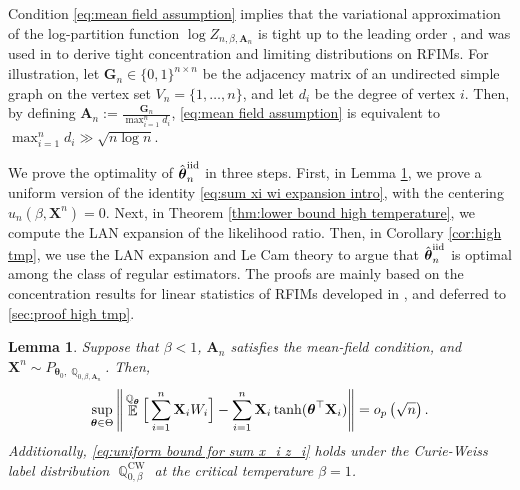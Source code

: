 \documentclass[preprint,reqno]{imsart}
\newtheorem{lemma}[thm]{Lemma}
\newcommand{\ttheta}{\boldsymbol{\theta}}
\DeclareMathOperator{\EE}{\mathbb{E}}
\DeclareMathOperator{\QQ}{\mathbb{Q}}
\newcommand{\A}{\mathbf{A}}
\newcommand{\X}{\mathbf{X}}
\DeclareMathOperator{\sumin}{\sum_{\mathnormal i=1}^{\mathnormal n}}
\newcommand{\thetaiid}{\hat{\boldsymbol \theta}^{\text{iid}}_{\mathnormal n}}
\begin{document}
%
\noindent Condition \eqref{eq:mean field assumption} implies that the variational approximation of the log-partition function $\log Z_{n,\beta,\A_n}$ is tight up to the leading order \citep[][also see eq. \eqref{eq:gibbs variational principle} below]{basak2017universality}, and was used in \cite{lee2024rfim,lee2025clt} to derive tight concentration and limiting distributions on RFIMs.
%
For illustration, let $\mathbf{G}_n \in \{0,1\}^{n \times n}$ be the adjacency matrix of an undirected simple graph on the vertex set $V_n = \{1, \ldots, n\}$, and let $d_i$ be the degree of vertex $i$. Then, by defining $ \A_n := \frac{\mathbf{G}_n}{\max_{i=1}^n d_i}$, \eqref{eq:mean field assumption} is 
equivalent to ${\max_{i=1}^n d_i} \gg \sqrt{n \log n}$.

We prove the optimality of $\thetaiid$ in three steps. First, in Lemma \ref{lem:sum x_i z_i}, we prove a uniform version of the identity \eqref{eq:sum xi wi expansion intro}, with the centering $u_n(\beta, \X^n) = 0$. Next, in Theorem \ref{thm:lower bound high temperature}, we compute the LAN expansion of the likelihood ratio. Then, in Corollary \ref{cor:high tmp}, we use the LAN expansion and Le Cam theory to argue that $\thetaiid$ is optimal among the class of regular estimators. The proofs are mainly based on the concentration results for linear statistics of RFIMs developed in \cite{lee2024rfim}, and deferred to \cref{sec:proof high tmp}.

%



%

%


\begin{lemma}\label{lem:sum x_i z_i}
    Suppose that $\beta <1$, $\A_n$ satisfies the mean-field condition, and $\X^n \sim P_{\ttheta_0,\QQ_{0, \beta, \A_n}}$. Then,     \begin{equation}\label{eq:uniform bound for sum x_i z_i}
        \sup_{\ttheta\in \Theta} \Bigg\lVert \EE^{\QQ_{\ttheta}} \Big[\sumin \X_i W_i \Big] - \sumin \X_i \tanh(\ttheta^\top \X_i) \Bigg\rVert = o_p\left({\sqrt{n}} \right).
    \end{equation}
    Additionally, \eqref{eq:uniform bound for sum x_i z_i} holds under the Curie-Weiss label distribution $\QQ_{0,\beta}^{\text{CW}}$ at the critical temperature $\beta = 1$. %
\end{lemma}
\end{document}
